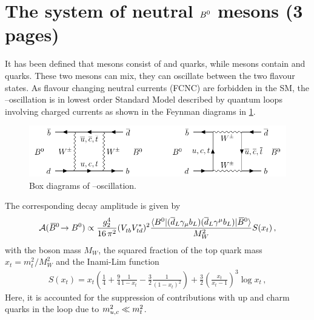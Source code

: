 
\section{The system of neutral \texorpdfstring{${{B}^0}$}{B0} mesons (3 pages)}
\label{sec:cpviolation:neutralBmesons}

It has been defined that \Bd mesons consist of \bquarkbar and
\dquark quarks, while \Bdb mesons contain \bquark and
\dquarkbar quarks. These two mesons can mix, \ie they can oscillate between
the two flavour states. As flavour changing neutral currents (FCNC) are
forbidden in the SM, the \Bd--\Bdb oscillation is in lowest order Standard
Model described by quantum loops involving charged currents as shown in the
Feynman diagrams in
\cref{fig:cpviolation:neutralBmesons:boxdiagram}.
\begin{figure}[htb]
\centering
\includegraphics[width=\textwidth]{03-CPViolation/tikz/pdf/Boxdiagrams.pdf}
\caption{Box diagrams of \Bd--\Bdb oscillation.}
\label{fig:cpviolation:neutralBmesons:boxdiagram}
\end{figure}
The corresponding decay amplitude is given by
\begin{align}
	\mathcal{A}({{\kern 0.18em\overline{\kern -0.18em B}{}}{}^0}\!\rightarrow{\ensuremath{{B}^0}}) \propto \frac{g_2^4}{16\,\pi^2}({V_{{t}{b}}^{}}{V_{{t}{d}}^\ast})^2 \frac{\langle {\ensuremath{{B}^0}}|({\overline {{d}}}_L\gamma_\mu{\ensuremath{b}}_L)({\overline {{d}}}_L\gamma^\mu{\ensuremath{b}}_L)|{{\kern 0.18em\overline{\kern -0.18em B}{}}{}^0}\rangle}{M_W^2}S(x_t)\,,
\end{align}
with the \W boson mass $M_W$, the squared fraction of the top quark mass $x_t
= m_t^2/M_W^2$ and the Inami-Lim function~\cite{Inami:1980fz}
\begin{align}
	S(x_t) = x_t \left(\frac 14 + \frac 94 \frac{1}{1 - x_t} - \frac 32 \frac{1}{(1 - x_t)^2}\right) + \frac 32 \left(\frac{x_t}{x_t - 1}\right)^3 \log x_t\,,
\end{align}
Here, it is accounted for the suppression of contributions with up and charm quarks
in the loop due to $m_{{u},{c}}^2 \ll m_{{t}}^2$.

